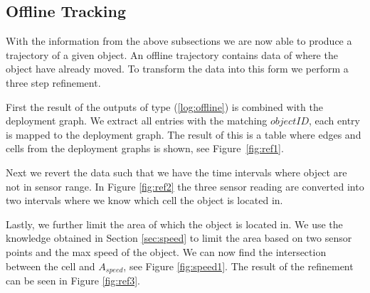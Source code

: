 \subsection{Offline Tracking}
\label{sub:offline}
With the information from the above subsections we are now able to produce a trajectory of a given object.
An offline trajectory contains data of where the object have already moved.
To transform the data into this form we perform a three step refinement.

First the result of the outputs of type (\ref{log:offline}) is combined with the deployment graph.
We extract all entries with the matching $objectID$, each entry is mapped to the deployment graph.
The result of this is a table where edges and cells from the deployment graphs is shown, see Figure~\ref{fig:ref1}.  

Next we revert the data such that we have the time intervals where object are not in sensor range.
In Figure \ref{fig:ref2} the three sensor reading are converted into two intervals where we know which cell the object is located in.

Lastly, we further limit the area of which the object is located in. 
We use the knowledge obtained in Section \ref{sec:speed} to limit the area based on two sensor points and the max speed of the object.
We can now find the intersection between the cell and $A_{speed}$, see Figure \ref{fig:speed1}.
The result of the refinement can be seen in Figure \ref{fig:ref3}.
 


